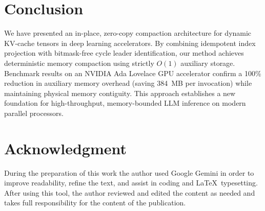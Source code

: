 \documentclass[journal,10pt,twocolumn]{article}
\begin{document}
\section{Conclusion}
\label{sec:conclusion}
We have presented an in-place, zero-copy compaction architecture for dynamic KV-cache tensors in deep learning accelerators. By combining idempotent index projection with bitmask-free cycle leader identification, our method achieves deterministic memory compaction using strictly $O(1)$ auxiliary storage. Benchmark results on an NVIDIA Ada Lovelace GPU accelerator confirm a 100\% reduction in auxiliary memory overhead (saving 384~MB per invocation) while maintaining physical memory contiguity. This approach establishes a new foundation for high-throughput, memory-bounded LLM inference on modern parallel processors.

\section*{Acknowledgment}
During the preparation of this work the author used Google Gemini in order to improve readability, refine the text, and assist in coding and \LaTeX\ typesetting. After using this tool, the author reviewed and edited the content as needed and takes full responsibility for the content of the publication.



\end{document}
